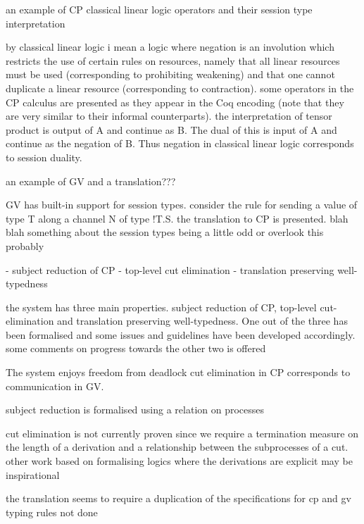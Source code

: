 \documentclass{beamer}
\begin{document}
\begin{frame}
an example of CP classical linear logic operators and their session type
interpretation
\end{frame}

by classical linear logic i mean a logic where negation is an involution which
restricts the use of certain rules on resources, namely that all linear
resources must be used (corresponding to prohibiting weakening) and that one
cannot duplicate a linear resource (corresponding to contraction). some
operators in the CP calculus are presented as they appear in the Coq encoding
(note that they are very similar to their informal counterparts). the
interpretation of tensor product is output of A and continue as B. The dual of
this is input of A and continue as the negation of B. Thus negation in
classical linear logic corresponds to session duality.

\begin{frame}
an example of GV and a translation???
\end{frame}

GV has built-in support for session types. consider the rule for sending a
value of type T along a channel N of type !T.S. the translation to CP is
presented. blah blah something about the session types being a little odd or
overlook this probably

\begin{frame}
- subject reduction of CP
- top-level cut elimination
- translation preserving well-typedness
\end{frame}

the system has three main properties. subject reduction of CP, top-level
cut-elimination and translation preserving well-typedness. One out of the
three has been formalised and some issues and guidelines have been developed
accordingly. some comments on progress towards the other two is offered

The system enjoys freedom from deadlock cut elimination in CP corresponds to
communication in GV.

subject reduction is formalised using a relation on processes

cut elimination is not currently proven since we require a termination measure
on the length of a derivation and a relationship between the subprocesses of a
cut. other work based on formalising logics where the derivations are explicit
may be inspirational

the translation seems to require a duplication of the specifications for cp
and gv typing rules not done
\end{document}
